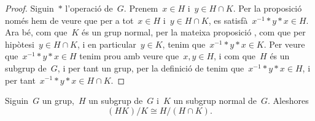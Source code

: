 \documentclass[../../main.tex]{subfiles}
\begin{document}
    \begin{proof}
        Siguin~\(\ast\) l'operació de~\(G\).
        Prenem~\(x\in H\) i~\(y\in H\cap K\).
        Per la proposició  només hem de veure que per a tot~\(x\in H\) i~\(y\in H\cap K\), es satisfà~\(x^{-1}\ast y\ast x\in H\).
        Ara bé, com que~\(K\) és un grup normal, per la mateixa proposició , com que per hipòtesi~\(y\in H\cap K\), i en particular~\(y\in K\), tenim que~\(x^{-1}\ast y\ast x\in K\).
        Per veure que~\(x^{-1}\ast y\ast x\in H\) tenim prou amb veure que~\(x,y\in H\), i com que~\(H\) és un subgrup de~\(G\), i per tant un grup, per la definició de  tenim que~\(x^{-1}\ast y\ast x\in H\), i per tant~\(x^{-1}\ast y\ast x\in H\cap K\).
    \end{proof}
    \begin{theorem}
        \label{thm:Segon-Teorema-de-lisomorfisme-entre-grups}
        Siguin~\(G\) un grup,~\(H\) un subgrup de~\(G\) i~\(K\) un subgrup normal de~\(G\).
        Aleshores
        \[
            (HK)/K\cong H/(H\cap K).
        \]
    \end{theorem}
\end{document}
